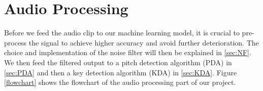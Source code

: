 
\chapter{Audio Processing} %

\label{Chapter5} %
Before we feed the audio clip to our machine learning model, it is crucial to pre-process the signal to achieve higher accuracy
and avoid further deterioration.
The choice and implementation of the noise filter will then be explained in \autoref{sec:NF}. We then feed the filtered output 
to a pitch detection algorithm (PDA) in \autoref{sec:PDA} and then a key detection algorithm (KDA) in \autoref{sec:KDA}.
Figure \ref{flowchart} shows the flowchart of the audio processing part of our project.

